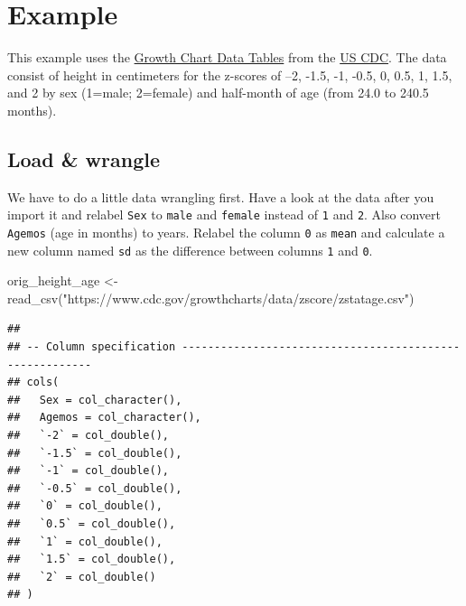 \documentclass[
  oneside]{book}
\newenvironment{Shaded}{\begin{snugshade}}{\end{snugshade}}
\newcommand{\FunctionTok}[1]{\textcolor[rgb]{0.00,0.00,0.00}{#1}}
\newcommand{\NormalTok}[1]{#1}
\newcommand{\OtherTok}[1]{\textcolor[rgb]{0.56,0.35,0.01}{#1}}
\newcommand{\StringTok}[1]{\textcolor[rgb]{0.31,0.60,0.02}{#1}}
\begin{document}
\hypertarget{example}{%
\section{Example}\label{example}}

This example uses the \href{https://www.cdc.gov/growthcharts/data/zscore/zstatage.csv}{Growth Chart Data Tables} from the \href{https://www.cdc.gov/growthcharts/zscore.htm}{US CDC}. The data consist of height in centimeters for the z-scores of --2, -1.5, -1, -0.5, 0, 0.5, 1, 1.5, and 2 by sex (1=male; 2=female) and half-month of age (from 24.0 to 240.5 months).

\hypertarget{load-wrangle}{%
\subsection{Load \& wrangle}\label{load-wrangle}}

We have to do a little data wrangling first. Have a look at the data after you import it and relabel \texttt{Sex} to \texttt{male} and \texttt{female} instead of \texttt{1} and \texttt{2}. Also convert \texttt{Agemos} (age in months) to years. Relabel the column \texttt{0} as \texttt{mean} and calculate a new column named \texttt{sd} as the difference between columns \texttt{1} and \texttt{0}.

\begin{Shaded}
\begin{Highlighting}[]
\NormalTok{orig\_height\_age }\OtherTok{\textless{}{-}} \FunctionTok{read\_csv}\NormalTok{(}\StringTok{"https://www.cdc.gov/growthcharts/data/zscore/zstatage.csv"}\NormalTok{) }
\end{Highlighting}
\end{Shaded}

\begin{verbatim}
## 
## -- Column specification --------------------------------------------------------
## cols(
##   Sex = col_character(),
##   Agemos = col_character(),
##   `-2` = col_double(),
##   `-1.5` = col_double(),
##   `-1` = col_double(),
##   `-0.5` = col_double(),
##   `0` = col_double(),
##   `0.5` = col_double(),
##   `1` = col_double(),
##   `1.5` = col_double(),
##   `2` = col_double()
## )
\end{verbatim}
\end{document}
